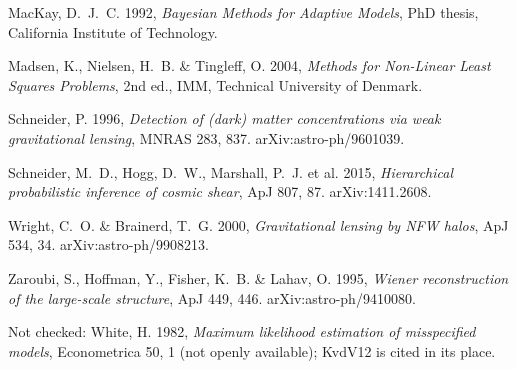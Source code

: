 \begin{description}[itemsep=2pt,font=\normalfont\bfseries]
\item[M92t] MacKay, D.~J.~C. 1992, \emph{Bayesian Methods for Adaptive Models}, PhD thesis, California Institute of Technology.
\item[MNT04] Madsen, K., Nielsen, H.~B. \& Tingleff, O. 2004, \emph{Methods for Non-Linear Least Squares Problems}, 2nd ed., IMM, Technical University of Denmark.
\item[S96] Schneider, P. 1996, \emph{Detection of (dark) matter concentrations via weak gravitational lensing}, MNRAS 283, 837. arXiv:astro-ph/9601039.
\item[Sch15] Schneider, M.~D., Hogg, D.~W., Marshall, P.~J. et al. 2015, \emph{Hierarchical probabilistic inference of cosmic shear}, ApJ 807, 87. arXiv:1411.2608.
\item[WB00] Wright, C.~O. \& Brainerd, T.~G. 2000, \emph{Gravitational lensing by NFW halos}, ApJ 534, 34. arXiv:astro-ph/9908213.
\item[Z95] Zaroubi, S., Hoffman, Y., Fisher, K.~B. \& Lahav, O. 1995, \emph{Wiener reconstruction of the large-scale structure}, ApJ 449, 446. arXiv:astro-ph/9410080.
\end{description}
Not checked: White, H. 1982, \emph{Maximum likelihood estimation of misspecified models}, Econometrica 50, 1 (not openly available); KvdV12 is cited in its place.

